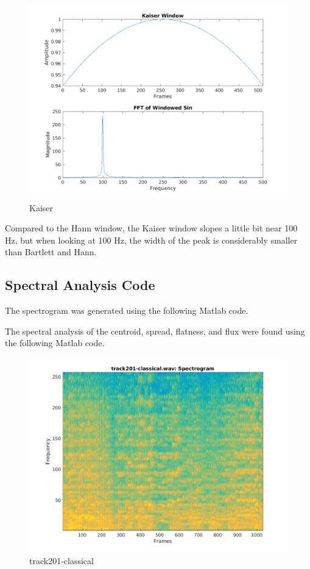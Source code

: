 \documentclass[11pt, a4paper]{article}
\begin{document}
\begin{figure}[H]
    \centering
    \includegraphics[width=.8\textwidth]{kaiser-sin.png}
    \caption{Kaiser}
\end{figure}

Compared to the Hann window, the Kaiser window slopes a little bit near 100 Hz, but when looking at 100 Hz, the width of the peak is considerably smaller than Bartlett and Hann. 


\subsection{Spectral Analysis Code}

The spectrogram was generated using the following Matlab code.


The spectral analysis of the centroid, spread, flatness, and flux were found using the following Matlab code. 


\pagebreak

\begin{figure}[H]
    \centering
    \includegraphics[width=.75\textwidth]{track201-classical-specto.png}
    \caption{track201-classical}
\end{figure}
\end{document}
